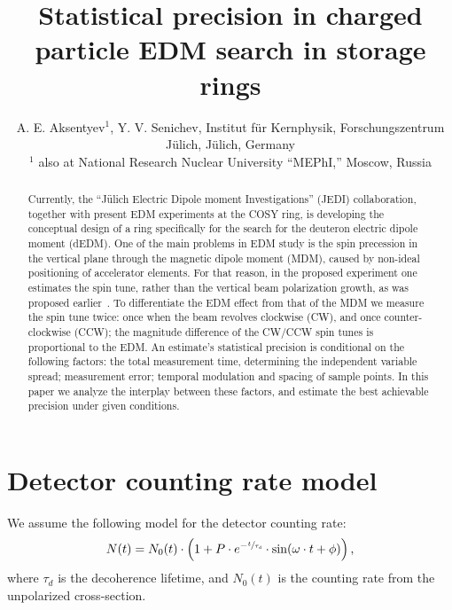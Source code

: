 \documentclass[a4paper]{jacow}
\newcommand{\LTd}{\tau_d}
\begin{document}
\title{Statistical precision in charged particle EDM search in storage rings}
\author{A. E. Aksentyev$^1$\footnotemark[2], Y. V. Senichev, Institut f\"ur Kernphysik, Forschungszentrum J\"ulich, J\"ulich, Germany \\$^1$ also at National Research Nuclear University ``MEPhI,'' Moscow, Russia}
\maketitle
{}

\begin{abstract}
	Currently, the ``J\"ulich Electric Dipole moment Investigations'' (JEDI) collaboration, together with present EDM experiments at the COSY ring, is developing the conceptual design of a ring specifically for the search for the deuteron electric dipole moment (dEDM). One of the main problems in EDM study is the spin precession in the vertical plane through the magnetic dipole moment (MDM), caused by non-ideal positioning of accelerator elements. For that reason, in the proposed experiment one estimates the spin tune, rather than the vertical beam polarization growth, as was proposed earlier~\cite{BNL}. To differentiate the EDM effect from that of the MDM we measure the spin tune twice: once when the beam revolves clockwise (CW), and once counter-clockwise (CCW); the magnitude difference of the CW/CCW spin tunes is proportional to the EDM. An estimate's statistical precision is conditional on the following factors: the total measurement time, determining the independent variable spread; measurement error; temporal modulation and spacing of sample points. In this paper we analyze the interplay between these factors, and estimate the best achievable precision under given conditions.
\end{abstract}

\section{Detector counting rate model}
We assume the following model for the detector counting rate:
\begin{equation}\label{eq:DetCntRt}
	N(t) = N_0(t)\cdot\bkt{1 + P\cdot e^{-\sfrac{t}{\LTd}}\cdot\sin(\omega\cdot t + \phi)},
\end{equation}
where $\LTd$ is the decoherence lifetime, and $N_0(t)$ is the counting rate from the unpolarized cross-section.
\end{document}
